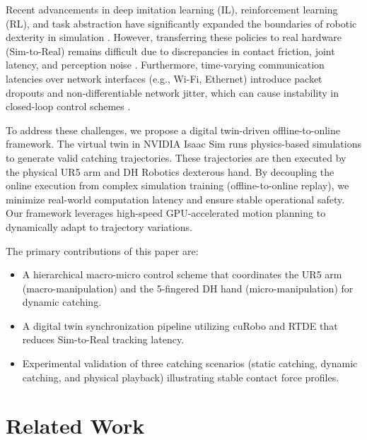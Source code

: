 \documentclass[letterpaper,journal]{IEEEtran}
\begin{document}
Recent advancements in deep imitation learning (IL), reinforcement learning (RL), and task abstraction have significantly expanded the boundaries of robotic dexterity in simulation \cite{force_optimization, humanmimic, visual_policy_clutter}. However, transferring these policies to real hardware (Sim-to-Real) remains difficult due to discrepancies in contact friction, joint latency, and perception noise \cite{sim2real_survey, contact_survey}. Furthermore, time-varying communication latencies over network interfaces (e.g., Wi-Fi, Ethernet) introduce packet dropouts and non-differentiable network jitter, which can cause instability in closed-loop control schemes \cite{haptic_delay_lkf}.

To address these challenges, we propose a digital twin-driven offline-to-online framework. The virtual twin in NVIDIA Isaac Sim runs physics-based simulations to generate valid catching trajectories. These trajectories are then executed by the physical UR5 arm and DH Robotics dexterous hand. By decoupling the online execution from complex simulation training (offline-to-online replay), we minimize real-world computation latency and ensure stable operational safety. Our framework leverages high-speed GPU-accelerated motion planning to dynamically adapt to trajectory variations.

The primary contributions of this paper are:
\begin{itemize}
    \item A hierarchical macro-micro control scheme that coordinates the UR5 arm (macro-manipulation) and the 5-fingered DH hand (micro-manipulation) for dynamic catching.
    \item A digital twin synchronization pipeline utilizing cuRobo and RTDE that reduces Sim-to-Real tracking latency.
    \item Experimental validation of three catching scenarios (static catching, dynamic catching, and physical playback) illustrating stable contact force profiles.
\end{itemize}

\section{Related Work}
\end{document}
